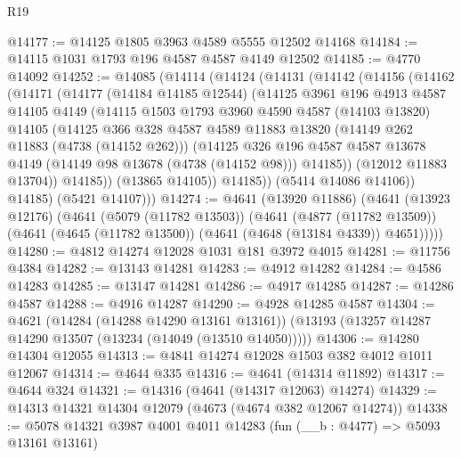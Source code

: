 \begin{lexlean}{R19}
\begin{coremodule}
@14177 := @14125 @1805 @3963 @4589 @5555 @12502 @14168
@14184 := @14115 @1031 @1793 @196 @4587 @4587 @4149 @12502
@14185 := @4770 @14092
@14252 := @14085
    (@14114
      (@14124
        (@14131
          (@14142
            (@14156
              (@14162
                (@14171
                  (@14177
                    (@14184 @14185 @12544)
                    (@14125
                      @3961
                      @196
                      @4913
                      @4587
                      @14105
                      @4149
                      (@14115
                        @1503
                        @1793
                        @3960
                        @4590
                        @4587
                        (@14103 @13820)
                        @14105
                        (@14125
                          @366
                          @328
                          @4587
                          @4589
                          @11883
                          @13820
                          (@14149 @262 @11883 (@4738 (@14152 @262)))
                          (@14125
                            @326
                            @196
                            @4587
                            @4587
                            @13678
                            @4149
                            (@14149 @98 @13678 (@4738 (@14152 @98)))
                            @14185))
                        (@12012 @11883 @13704))
                      @14185))
                  (@13865 @14105))
                @14185))
            (@5414 @14086 @14106))
          @14185)
        (@5421 @14107)))
@14274 := @4641
    (@13920 @11886)
    (@4641
      (@13923 @12176)
      (@4641
        (@5079 (@11782 @13503))
        (@4641
          (@4877 (@11782 @13509))
          (@4641 (@4645 (@11782 @13500)) (@4641 (@4648 (@13184 @4339)) @4651)))))
@14280 := @4812 @14274 @12028 @1031 @181 @3972 @4015
@14281 := @11756 @4384
@14282 := @13143 @14281
@14283 := @4912 @14282
@14284 := @4586 @14283
@14285 := @13147 @14281
@14286 := @4917 @14285
@14287 := @14286 @4587
@14288 := @4916 @14287
@14290 := @4928 @14285 @4587
@14304 := @4621
    (@14284 (@14288 @14290 @13161 @13161))
    (@13193 (@13257 @14287 @14290 @13507 (@13234 (@14049 (@13510 @14050)))))
@14306 := @14280 @14304 @12055
@14313 := @4841 @14274 @12028 @1503 @382 @4012 @1011 @12067
@14314 := @4644 @335
@14316 := @4641 (@14314 @11892)
@14317 := @4644 @324
@14321 := @14316 (@4641 (@14317 @12063) @14274)
@14329 := @14313 @14321 @14304 @12079 (@4673 (@4674 @382 @12067 @14274))
@14338 := @5078 @14321 @3987 @4001 @4011 @14283 (fun (__b : @4477) => @5093 @13161 @13161)

\end{coremodule}
\end{lexlean}

